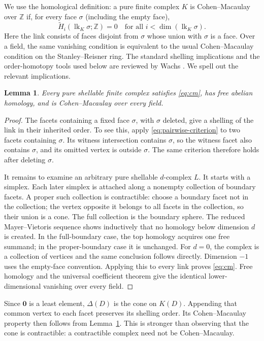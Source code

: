 \documentclass[11pt]{article}
\numberwithin{equation}{section}
\newtheorem{lemma}[theorem]{Lemma}
\theoremstyle{definition}
\theoremstyle{remark}
\newcommand{\Z}{\mathbb Z}
\newcommand{\zero}{\mathbf 0}
\newcommand{\lk}{\operatorname{lk}}
\begin{document}
We use the homological definition: a pure finite complex $K$ is
Cohen--Macaulay over $\Z$ if, for every face $\sigma$ (including the empty
face),
\begin{equation}
 \widetilde H_i(\lk_K\sigma;\Z)=0
       \quad\text{for all }i<\dim(\lk_K\sigma).
 \label{eq:cm}
\end{equation}
Here the link consists of faces disjoint from $\sigma$ whose union with
$\sigma$ is a face. Over a field, the same vanishing condition is equivalent
to the usual Cohen--Macaulay condition on the Stanley--Reisner ring. The
standard shelling implications and the order-homotopy tools used below are
reviewed by Wachs \cite{Wachs}. We spell out the relevant implications.

\begin{lemma}
\label{lem:shell-cm}
Every pure shellable finite complex satisfies \eqref{eq:cm}, has free abelian
homology, and is Cohen--Macaulay over every field.
\end{lemma}

\begin{proof}
The facets containing a fixed face $\sigma$, with $\sigma$ deleted, give a
shelling of the link in their inherited order. To see this, apply
\eqref{eq:pairwise-criterion} to two facets containing $\sigma$. Its witness
intersection contains $\sigma$, so the witness facet also contains $\sigma$,
and its omitted vertex is outside $\sigma$. The same criterion therefore
holds after deleting $\sigma$.

It remains to examine an arbitrary pure shellable $d$-complex $L$. It starts
with a simplex. Each later simplex is attached along a nonempty collection
of boundary facets. A proper such collection is contractible: choose a
boundary facet not in the collection; the vertex opposite it belongs to all
facets in the collection, so their union is a cone. The full collection is
the boundary sphere. The reduced Mayer--Vietoris sequence shows inductively
that no homology below dimension $d$ is created. In the full-boundary case,
the top homology acquires one free summand; in the proper-boundary case it is
unchanged. For $d=0$, the complex is a collection of vertices and the same
conclusion follows directly. Dimension $-1$ uses the empty-face convention.
Applying this to every link proves \eqref{eq:cm}. Free homology and the
universal coefficient theorem give the identical lower-dimensional
vanishing over every field.
\end{proof}

Since $\zero$ is a least element, $\Delta(D)$ is the cone on $K(D)$.
Appending that common vertex to each facet preserves its shelling order.
Its Cohen--Macaulay property then follows from Lemma~\ref{lem:shell-cm}.
This is stronger than observing that the cone is contractible: a
contractible complex need not be Cohen--Macaulay.
\end{document}
